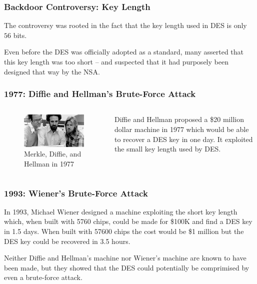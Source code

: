 \documentclass{beamer}
\newcommand{\<}{\langle}
\renewcommand{\>}{\rangle}
\begin{document}
\begin{frame}
\frametitle{Backdoor Controversy: Key Length}

The controversy was rooted in the fact that the key length used in DES is only $56$ bits. \newline

Even before the DES was officially adopted as a standard, many asserted that this key length was too short -- and suspected that it had purposely been designed that way by the NSA.
\end{frame}



\begin{frame}
\frametitle{1977: Diffie and Hellman's Brute-Force Attack}


\begin{columns}
\begin{column}{.6\textwidth}
\begin{figure}
\includegraphics[scale=.3]{IMG/merkle_diffie_hellman}
\caption{\scriptsize Merkle, Diffie, and Hellman in 1977}
\end{figure}
\end{column}

\begin{column}{.4\textwidth}\small
Diffie and Hellman proposed a \$20 million dollar machine in 1977 which would be able to recover a DES key in one day. It exploited the small key length used by DES.
\end{column}
\end{columns}
\end{frame}



\begin{frame}
\frametitle{1993: Wiener's Brute-Force Attack}

In 1993, Michael Wiener designed a machine exploiting the short key length which, when built with 5760 chips, could be made for \$100K and find a DES key in 1.5 days. When built with 57600 chips the cost would be \$1 million but the DES key could be recovered in 3.5 hours. \newline

Neither Diffie and Hellman's machine nor Wiener's machine are known to have been made, but they showed that the DES could potentially be comprimised by even a brute-force attack.
\end{frame}
\end{document}
